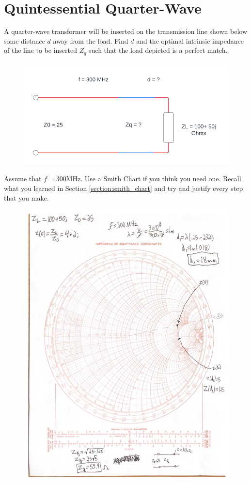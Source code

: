 \documentclass{article}
\begin{document}
\section{Quintessential Quarter-Wave}

A quarter-wave transformer will be inserted on the transmission line shown below some distance $d$ away from the load. Find $d$ and the optimal intrinsic impedance of the line to be inserted $Z_q$ such that the load depicted is a perfect match.

\begin{figure}[h]
\begin{center}
    \includegraphics[width= 0.8
    \textwidth]{figures/Quarter_wave_transformer.png}
\end{center}
\end{figure}

Assume that $f = 300$MHz. Use a Smith Chart if you think you need one. Recall what you learned in Section \ref{section:smith_chart} and try and justify every step that you make.

\begin{figure}[H]
\begin{center}
    \includegraphics[width= 0.8
    \textwidth]{figures/Quarter_transformer_solution.jpg}
\end{center}
\end{figure}
\end{document}
